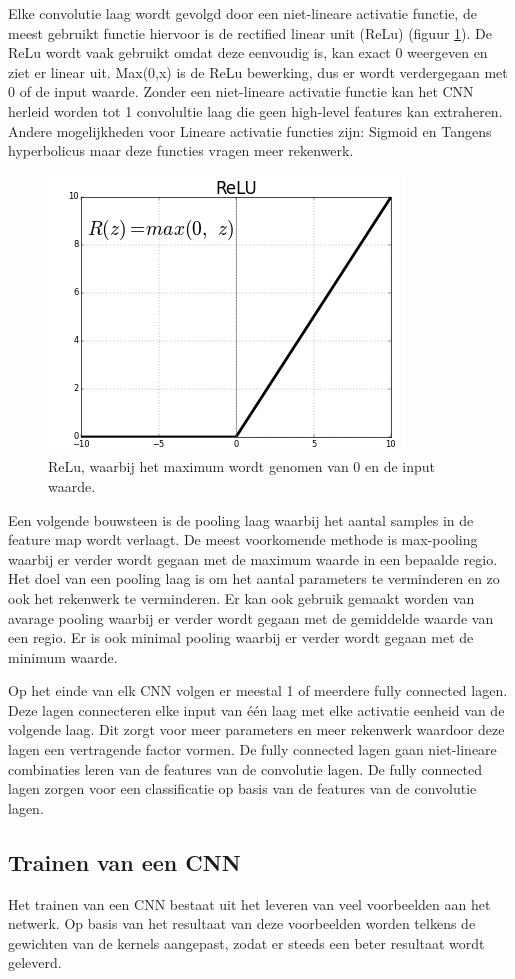 Elke convolutie laag wordt gevolgd door een niet-lineare activatie functie, de meest gebruikt functie hiervoor is de rectified linear unit (ReLu) (figuur \ref{fig:relu}). 
De ReLu wordt vaak gebruikt omdat deze eenvoudig is, kan exact 0 weergeven en ziet er linear uit. 
Max(0,x) is de ReLu bewerking, dus er wordt verdergegaan met 0 of de input waarde. 
Zonder een niet-lineare activatie functie kan het CNN herleid worden tot 1 convolultie laag die geen high-level features kan extraheren. 
Andere mogelijkheden voor Lineare activatie functies zijn: Sigmoid en Tangens hyperbolicus maar deze functies vragen meer rekenwerk.

\begin{figure}[!ht]
 	\centering
 	\includegraphics[width=0.35\linewidth]{fig/ReLu.png}
 	\caption{ReLu, waarbij het maximum wordt genomen van 0 en de input waarde.}
 	\label{fig:relu}
\end{figure}

Een volgende bouwsteen is de pooling laag waarbij het aantal samples in de feature map wordt verlaagt. 
De meest voorkomende methode is max-pooling waarbij er verder wordt gegaan met de maximum waarde in een bepaalde regio. 
Het doel van een pooling laag is om het aantal parameters te verminderen en zo ook het rekenwerk te verminderen. 
Er kan ook gebruik gemaakt worden van avarage pooling waarbij er verder wordt gegaan met de gemiddelde waarde van een regio. 
Er is ook minimal pooling waarbij er verder wordt gegaan met de minimum waarde.

Op het einde van elk CNN volgen er meestal 1 of meerdere fully connected lagen. 
Deze lagen connecteren elke input van \'e\'en laag met elke activatie eenheid van de volgende laag. 
Dit zorgt voor meer parameters en meer rekenwerk waardoor deze lagen een vertragende factor vormen. 
De fully connected lagen gaan niet-lineare combinaties leren van de features van de convolutie lagen. 
De fully connected lagen zorgen voor een classificatie op basis van de features van de convolutie lagen.

\subsection{Trainen van een CNN}
Het trainen van een CNN bestaat uit het leveren van veel voorbeelden aan het netwerk. 
Op basis van het resultaat van deze voorbeelden worden telkens de gewichten van de kernels aangepast, zodat er steeds een beter resultaat wordt geleverd. 


